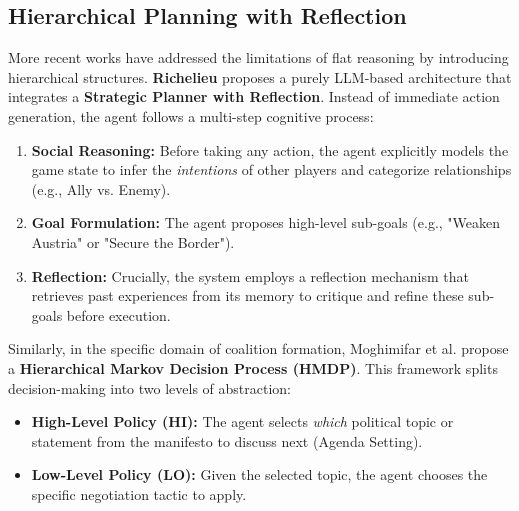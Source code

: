 \subsection{Hierarchical Planning with Reflection}
More recent works have addressed the limitations of flat reasoning by introducing hierarchical structures. \textbf{Richelieu} \cite{guan2024richelieu} proposes a purely LLM-based architecture that integrates a \textbf{Strategic Planner with Reflection}.
Instead of immediate action generation, the agent follows a multi-step cognitive process:
\begin{enumerate}
    \item \textbf{Social Reasoning:} Before taking any action, the agent explicitly models the game state to infer the \textit{intentions} of other players and categorize relationships (e.g., Ally vs. Enemy).
    \item \textbf{Goal Formulation:} The agent proposes high-level sub-goals (e.g., "Weaken Austria" or "Secure the Border").
    \item \textbf{Reflection:} Crucially, the system employs a reflection mechanism that retrieves past experiences from its memory to critique and refine these sub-goals before execution.
\end{enumerate}

Similarly, in the specific domain of coalition formation, Moghimifar et al. \cite{moghimifar2024modelling} propose a \textbf{Hierarchical Markov Decision Process (HMDP)}. This framework splits decision-making into two levels of abstraction:
\begin{itemize}
    \item \textbf{High-Level Policy (HI):} The agent selects \textit{which} political topic or statement from the manifesto to discuss next (Agenda Setting).
    \item \textbf{Low-Level Policy (LO):} Given the selected topic, the agent chooses the specific negotiation tactic to apply.
\end{itemize}


